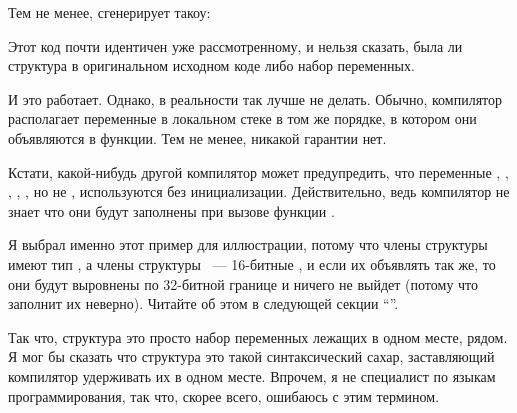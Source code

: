 Тем не менее, сгенерирует такоу:



Этот код почти идентичен уже рассмотренному, и нельзя сказать, была ли структура
в оригинальном исходном коде либо набор переменных.

И это работает. Однако, в реальности так лучше не делать. Обычно, компилятор располагает переменные в локальном
стеке в том же порядке, в котором они объявляются в функции. Тем не менее, никакой гарантии нет.

Кстати, какой-нибудь другой компилятор может предупредить, что переменные , , ,
, , но не , используются без инициализации. 
Действительно, ведь компилятор не знает
что они будут заполнены при вызове функции .

Я выбрал именно этот пример для иллюстрации, потому что члены структуры имеют тип \Tint, а члены структуры
 ~--- 16-битные , и если их объявлять так же, то они будут выровнены по 32-битной границе 
и ничего не выйдет (потому что  заполнит их неверно). Читайте об этом в следующей секции
``\StructurePackingSectionName''.

\index{\SyntacticSugar}
Так что, структура это просто набор переменных лежащих в одном месте, рядом. Я мог бы сказать что структура
это такой синтаксический сахар, заставляющий компилятор удерживать их в одном месте. Впрочем, я не специалист
по языкам программирования, так что, скорее всего, ошибаюсь с этим термином.

